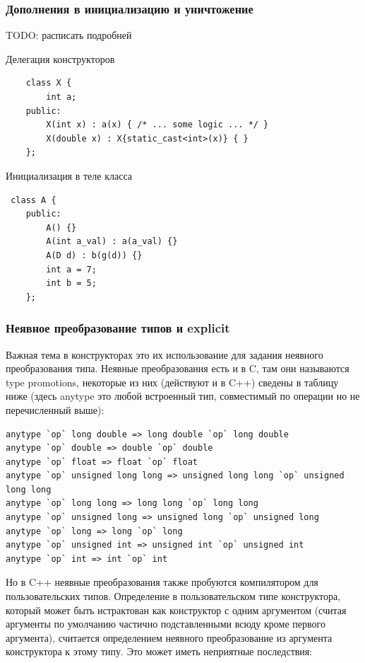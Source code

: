 \documentclass[a4paper,12pt,oneside]{article}
\begin{document}
\subsubsection{Дополнения в инициализацию и уничтожение}\label{ConstrDestrAddition}

TODO: расписать подробней

Делегация конструкторов

\begin{lstlisting}
    class X {
        int a;
    public:
        X(int x) : a(x) { /* ... some logic ... */ }
        X(double x) : X{static_cast<int>(x)} { }
    };
\end{lstlisting}

Инициализация в теле класса

\begin{lstlisting}
 class A {
    public:
        A() {}
        A(int a_val) : a(a_val) {}
        A(D d) : b(g(d)) {}
        int a = 7;
        int b = 5;  
    };
\end{lstlisting}

\subsubsection{Неявное преобразование типов и explicit}\label{Explicit}

Важная тема в конструкторах это их использование для задания неявного преобразования типа. Неявные преобразования есть и в C, там они называются type promotions, некоторые из них (действуют и в C++) сведены в таблицу ниже (здесь anytype это любой встроенный тип, совместимый по операции но не перечисленный выше):

\begin{lstlisting}
anytype `op` long double => long double `op` long double
anytype `op` double => double `op` double
anytype `op` float => float `op` float
anytype `op` unsigned long long => unsigned long long `op` unsigned long long
anytype `op` long long => long long `op` long long
anytype `op` unsigned long => unsigned long `op` unsigned long
anytype `op` long => long `op` long
anytype `op` unsigned int => unsigned int `op` unsigned int
anytype `op` int => int `op` int
\end{lstlisting}

Но в C++ неявные преобразования также пробуются компилятором для пользовательских типов. Определение в пользовательском типе конструктора, который может быть истрактован как конструктор с одним аргументом (считая аргументы по умолчанию частично подставленными всюду кроме первого аргумента), считается определением неявного преобразование из аргумента конструктора к этому типу. Это может иметь неприятные последствия:
\end{document}
